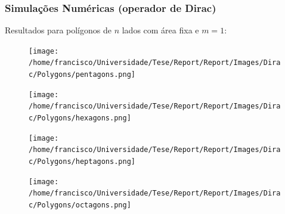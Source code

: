 \documentclass[portuguese,notheorems]{beamer}
\begin{document}
\begin{frame}\frametitle{Simulações Numéricas (operador de Dirac)}
    Resultados para polígonos de $n$ lados com área fixa e $m=1$:

    \begin{figure}
        \centering
        \begin{minipage}[b]{0.3\textwidth}
            \centering
            \texttt{[image: /home/francisco/Universidade/Tese/Report/Report/Images/Dirac/Polygons/pentagons.png]}
            \captionsetup{width=1.5\linewidth} %
            \label{dirac_polya_szego_evidence_pentagons}
        \end{minipage}
        \hspace*{2cm}
        \begin{minipage}[b]{0.3\textwidth}
            \centering
            \texttt{[image: /home/francisco/Universidade/Tese/Report/Report/Images/Dirac/Polygons/hexagons.png]}
                  \captionsetup{width=1.5\linewidth} %
                  \label{dirac_polya_szego_evidence_hexagons}
        \end{minipage}
    \end{figure}
    \vspace*{-0.9cm}
    \begin{figure}
        \centering
        \begin{minipage}[b]{0.3\textwidth}
            \centering
            \texttt{[image: /home/francisco/Universidade/Tese/Report/Report/Images/Dirac/Polygons/heptagons.png]}
                  \captionsetup{width=1.5\linewidth} %
            \label{dirac_polya_szego_evidence_heptagons}
        \end{minipage}
        \hspace*{2cm}
        \begin{minipage}[b]{0.3\textwidth}
            \centering
            \texttt{[image: /home/francisco/Universidade/Tese/Report/Report/Images/Dirac/Polygons/octagons.png]}
                  \captionsetup{width=1.5\linewidth} %
            \label{dirac_polya_szego_evidence_octagons}
        \end{minipage}
    \end{figure}
\end{frame}
\end{document}

